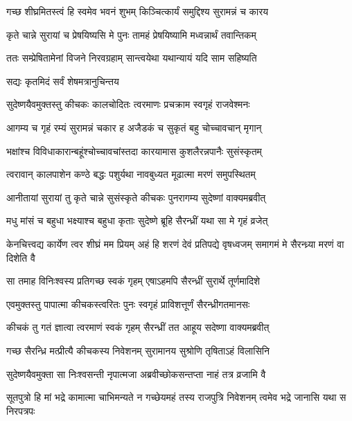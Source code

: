 \twolineshloka
{गच्छ शीघ्रमितस्त्वं हि स्वमेव भवनं शुभम्}
{किञ्चित्कार्यं समुद्दिश्य सुरामन्नं च कारय}


\twolineshloka
{कृते चान्ने सुरायां च प्रेषयिष्यसि मे पुनः}
{तामहं प्रेषयिष्यामि मध्वन्नार्थं तवान्तिकम्}


\twolineshloka
{ततः सम्प्रेषितामेनां विजने निरवग्रहाम्}
{सान्त्वयेथा यथान्यायं यदि साम सहिष्यति}


\onelineshloka
{सद्यः कृतमिदं सर्वं शेषमत्रानुचिन्तय}



\twolineshloka
{सुदेष्णयैवमुक्तस्तु कीचकः कालचोदितः}
{त्वरमाणः प्रचक्राम स्वगृहं राजवेश्मनः}


\twolineshloka
{आगम्य च गृहं रम्यं सुरामन्नं चकार ह}
{अजैडकं च सुकृतं बहु चोच्चावचान् मृगान्}


\twolineshloka
{भक्षांश्च विविधाकारान्बहूंश्चोच्चावचांस्तदा}
{कारयामास कुशलैरन्नपानैः सुसंस्कृतम्}


\twolineshloka
{त्वरावान् कालपाशेन कण्ठे बद्धः पशुर्यथा}
{नावबुध्यत मूढात्मा मरणं समुपस्थितम्}


\twolineshloka
{आनीतायां सुरायां तु कृते चान्ने सुसंस्कृते}
{कीचकः पुनरागम्य सुदेष्णां वाक्यमब्रवीत्}


\twolineshloka
{मधु मांसं च बहुधा भक्ष्याश्च बहुधा कृताः}
{सुदेष्णे ब्रूहि सैरन्ध्रीं यथा सा मे गृहं व्रजेत्}


\threelineshloka
{केनचित्त्वद्य कार्येण त्वर शीघ्रं मम प्रियम्}
{अहं हि शरणं देवं प्रतिपद्ये वृषध्वजम्}
{समागमं मे सैरन्ध्र्या मरणं वा दिशेति वै}



\twolineshloka
{सा तमाह विनिःश्वस्य प्रतिगच्छ स्वकं गृहम्}
{एषाऽहमपि सैरन्ध्रीं सुरार्थे तूर्णमादिशे}


\twolineshloka
{एवमुक्तस्तु पापात्मा कीचकस्त्वरितः पुनः}
{स्वगृहं प्राविशत्तूर्णं सैरन्ध्रीगतमानसः}


\twolineshloka
{कीचकं तु गतं ज्ञात्वा त्वरमाणं स्वकं गृहम्}
{सैरन्ध्रीं तत आहूय सदेष्णा वाक्यमब्रवीत्}


\twolineshloka
{गच्छ सैरन्ध्रि मत्प्रीत्यै कीचकस्य निवेशनम्}
{सुरामानय सुश्रोणि तृषिताऽहं विलासिनि}



\twolineshloka
{सुदेष्णयैवमुक्ता सा निःश्वसन्ती नृपात्मजा}
{अब्रवीच्छोकसन्तप्ता नाहं तत्र व्रजामि वै}


\threelineshloka
{सूतपुत्रो हि मां भद्रे कामात्मा चाभिमन्यते}
{न गच्छेयमहं तस्य राजपुत्रि निवेशनम्}
{त्वमेव भद्रे जानासि यथा स निरपत्रपः}


